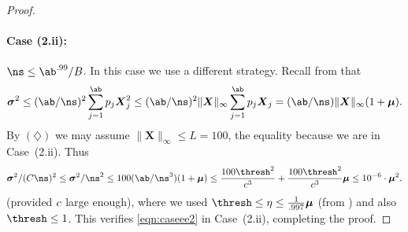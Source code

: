 \documentclass[11pt]{article}
\newcommand{\bX}{\boldsymbol{X}}
\newcommand{\bmu}{\boldsymbol{\mu}}
\newcommand{\bsigma}{\boldsymbol{\sigma}}
\begin{document}
\begin{proof}
	\paragraph{Case (2.ii):} $\ns \leq \ab^{.99}/B$. \quad In this case we use a different strategy.  
	Recall from  that
	\begin{equation}
		\bsigma^2 \leq (\ab/\ns)^2 \sum_{j=1}^{\ab} p_j \bX_j^2 \leq (\ab/\ns)^2 \|\bX\|_\infty \sum_{j=1}^{\ab} p_j \bX_j = (\ab/\ns) \|\bX\|_\infty (1+\bmu).
	\end{equation}
    By $(\diamondsuit)$ we may assume $\|\bX\|_\infty \leq L = 100$, the equality because we are in Case~(2.ii).
	Thus
	\begin{equation}
		\bsigma^2/(\cq\ns)^2 \leq \bsigma^2/\ns^2 \leq 100 (\ab/\ns^3) (1+\bmu) \leq \frac{100 \thresh^2}{\cc^3}+ \frac{100 \thresh^2}{\cc^3}\bmu \leq 10^{-6} \cdot \bmu^2.
	\end{equation}
	(provided $c$ large enough), where we used $\thresh \leq \eta \leq \frac{1}{.997}\bmu$ (from ) and also $\thresh \leq 1$.
    This verifies \cref{eqn:caseee2} in Case~(2.ii), completing the proof.
\end{proof}

\end{document}
